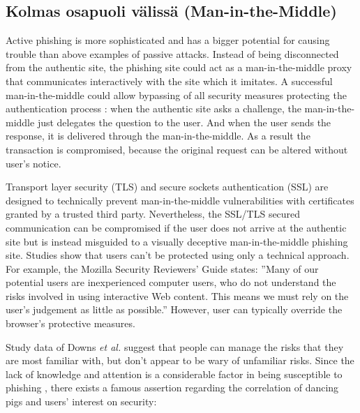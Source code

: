 \documentclass[english,gradu]{tktltiki}
\begin{document}

\subsection{Kolmas osapuoli välissä (Man-in-the-Middle)} %
\label{sub:kolmas_osapuoli_välissä_man_in_the_middle_}

\label{sec:man_in_the_middle}

Active phishing is more sophisticated and has a bigger potential for causing trouble than above examples of passive attacks. Instead of being disconnected from the authentic site, the phishing site could act as a man-in-the-middle proxy that communicates interactively with the site which it imitates. A successful man-in-the-middle could allow bypassing of all security measures protecting the authentication process \cite{beamauth_2factor_2007, schneier_2factor_2005, why_phishing_works_06}: when the authentic site asks a challenge, the man-in-the-middle just delegates the question to the user. And when the user sends the response, it is delivered through the man-in-the-middle. As a result the transaction is compromised, because the original request can be altered without user's notice.

Transport layer security (TLS) and secure sockets authentication (SSL) are designed to technically prevent man-in-the-middle vulnerabilities with certificates granted by a trusted third party. Nevertheless, the SSL/TLS secured communication can be compromised if the user does not arrive at the authentic site but is instead misguided to a visually deceptive man-in-the-middle phishing site. Studies \cite{why_phishing_works_06, suspectibility_to_phishing_2006} show that users can't be protected using only a technical approach. For example, the Mozilla Security Reviewers' Guide \cite{mozilla_security_guide_2010} states: ''Many of our potential users are inexperienced computer users, who do not understand the risks involved in using interactive Web content. This means we must rely on the user's judgement as little as possible.'' However, user can typically override the browser's protective measures.

Study data of Downs \emph{et al.} \cite{suspectibility_to_phishing_2006} suggest that people can manage the risks that they are most familiar with, but don't appear to be wary of unfamiliar risks. Since the lack of knowledge and attention is a considerable factor in being susceptible to phishing \cite{why_phishing_works_06}, there exists a famous assertion regarding the correlation of dancing pigs and users' interest on security:
\end{document}
